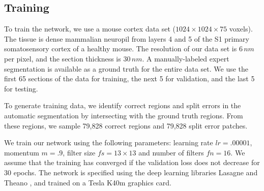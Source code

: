 \subsection{Training}
To train the network, we use a mouse cortex data set ($1024\times1024\times75$ voxels). The tissue is dense mammalian neuropil from layers 4 and 5 of the S1 primary somatosensory cortex of a healthy mouse. The resolution of our data set is $6\, nm$ per pixel, and the section thickness is $30\, nm$. 
A manually-labeled expert segmentation is available as a ground truth for the entire data set. We use the first 65 sections of the data for training, the next 5 for validation, and the last 5 for testing.
%

To generate training data, we identify correct regions and split errors in the automatic segmentation by intersecting with the ground truth regions. From these regions, we sample 79,828 correct regions and 79,828 split error patches.

We train our network using the following parameters: learning rate $lr=.00001$, momentum $m=.9$, filter size $fs=13\times13$ and number of filters $fn=16$. We assume that the training has converged if the validation loss does not decrease for 30 epochs. The network is specified using the deep learning libraries Lasagne and Theano \cite{Bastien-Theano-2012}, and trained on a Tesla K40m graphics card. 





